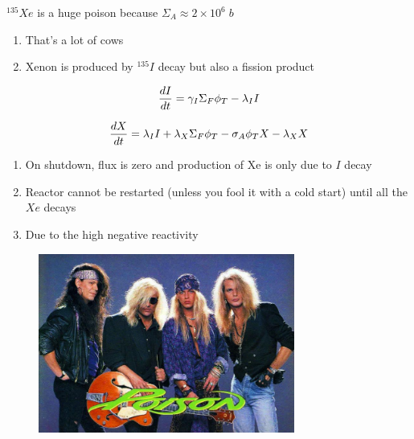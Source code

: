 \documentclass[aspectratio=1610,pdftex,dvipsnames,compress,xcolor={dvipsnames}]{beamer}
\begin{document}
\begin{frame}{$^{135}Xe$ is a huge poison because $\Sigma_A \approx 2 \times 10^6 \; b$}
    \begin{enumerate}[series=outerlist,topsep=0pt,itemsep=21pt,leftmargin=*,label=(\arabic*)]
        \item[]That's a lot of cows
        \item[]Xenon is produced by $^{135}I$ decay but also a fission product
    \end{enumerate}

    \vspace*{\fill}

    \begin{equation}
        \LARGE
        \frac{dI}{dt} = \gamma_I\Sigma_F\phi_T - \lambda_I I
    \end{equation}

    \begin{equation}
        \LARGE
        \frac{dX}{dt} = \lambda_I I + \lambda_X\Sigma_F\phi_T - \sigma_A\phi_T X - \lambda_X X
    \end{equation}

    \vspace*{\fill}

    \begin{enumerate}[series=outerlist,topsep=0pt,itemsep=21pt,leftmargin=*,label=(\arabic*)]
        \item[]On shutdown, flux is zero and production of Xe is only due to $I$ decay
        \item[]Reactor cannot be restarted (unless you fool it with a cold start) until all the $Xe$ decays
        \item[]Due to the high negative reactivity
    \end{enumerate}
\end{frame}


\begin{frame}{}
    \begin{figure}
        \centering
        \includegraphics[width=0.75\textwidth]{poison.jpg}
    \end{figure}
\end{frame}
\end{document}

